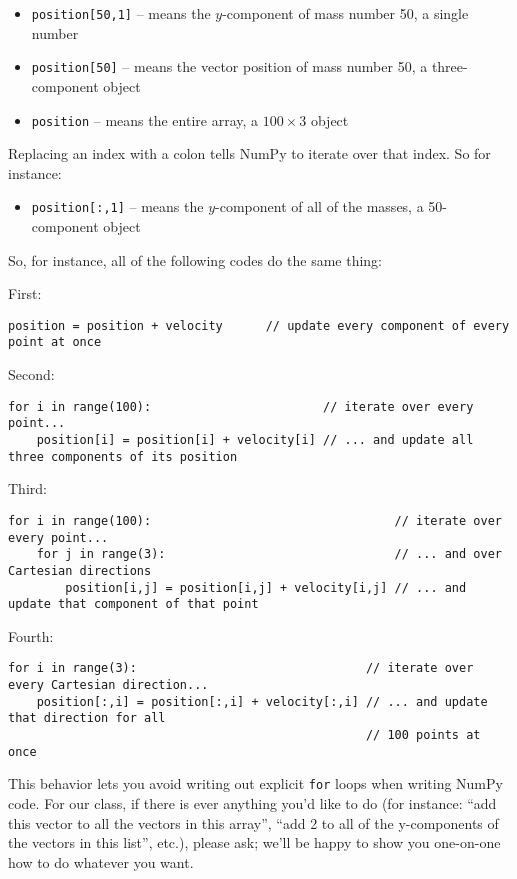 \documentclass[12ampt]{article}
\begin{document}
\begin{itemize}
	
	\item \verb|position[50,1]| \tabto{1.2in}-- means the $y$-component of mass number 50, a single number
	\item \verb|position[50]| \tabto{1.2in} -- means the vector position of mass number 50, a three-component object
    \item \verb|position| \tabto{1.2in} -- means the entire array, a $100\times3$ object
\end{itemize}

Replacing an index with a colon tells NumPy to iterate over that index. So for instance:
\begin{itemize}
	
	\item \verb|position[:,1]| \tabto{1.2in}-- means the $y$-component of all of the masses, a 50-component object
\end{itemize}


So, for instance, all of the following codes do the same thing:

First:
\begin{verbatim}
position = position + velocity      // update every component of every point at once
\end{verbatim}


\bigskip

Second:
\begin{verbatim}
for i in range(100):                        // iterate over every point...
    position[i] = position[i] + velocity[i] // ... and update all three components of its position
\end{verbatim}

\bigskip

Third:
\begin{verbatim}
for i in range(100):                                  // iterate over every point...
    for j in range(3):                                // ... and over Cartesian directions
        position[i,j] = position[i,j] + velocity[i,j] // ... and update that component of that point
\end{verbatim}

\bigskip

Fourth:
\begin{verbatim}
for i in range(3):                                // iterate over every Cartesian direction...
    position[:,i] = position[:,i] + velocity[:,i] // ... and update that direction for all 
                                                  // 100 points at once
\end{verbatim}


This behavior lets you avoid writing out explicit \verb|for| loops when writing NumPy code. For our class, if there is ever anything you'd like to do (for instance: ``add this vector to all the vectors in this array'', ``add 2 to all of the y-components of the vectors in this list'', etc.), please ask; we'll be happy to show you one-on-one how to do whatever you want.
\end{document}
